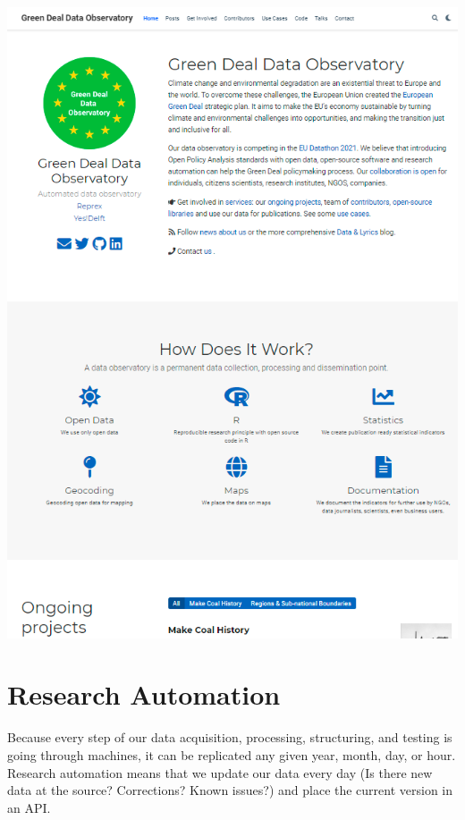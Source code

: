 \documentclass[
  a4paper,
  openany, a4paper, oneside]{book}
\begin{document}
\begin{center}\includegraphics[width=9.17in]{plots/green_deal_hugo} \end{center}

\hypertarget{research-automation}{%
\section{Research Automation}\label{research-automation}}

Because every step of our data acquisition, processing, structuring, and testing is going through machines, it can be replicated any given year, month, day, or hour. Research automation means that we update our data every day (Is there new data at the source? Corrections? Known issues?) and place the current version in an API.
\end{document}
